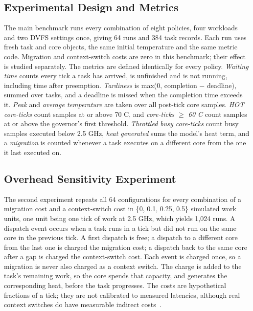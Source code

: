 \documentclass[conference]{IEEEtran}
\begin{document}
\subsection{Experimental Design and Metrics}\label{sec:method-design}
The main benchmark runs every combination of eight policies, four workloads and two DVFS settings once, giving 64 runs and 384 task records. Each run uses fresh task and core objects, the same initial temperature and the same metric code. Migration and context-switch costs are zero in this benchmark; their effect is studied separately. The metrics are defined identically for every policy. \emph{Waiting time} counts every tick a task has arrived, is unfinished and is not running, including time after preemption. \emph{Tardiness} is max(0, completion $-$ deadline), summed over tasks, and a deadline is missed when the completion time exceeds it. \emph{Peak} and \emph{average temperature} are taken over all post-tick core samples. \emph{HOT core-ticks} count samples at or above 70 \textdegree{}C, and \emph{core-ticks $\geq$ 60 \textdegree{}C} count samples at or above the governor's first threshold. \emph{Throttled busy core-ticks} count busy samples executed below 2.5 GHz, \emph{heat generated} sums the model's heat term, and a \emph{migration} is counted whenever a task executes on a different core from the one it last executed on.

\subsection{Overhead Sensitivity Experiment}\label{sec:method-overhead}
The second experiment repeats all 64 configurations for every combination of a migration cost and a context-switch cost in \{0, 0.1, 0.25, 0.5\} simulated work units, one unit being one tick of work at 2.5 GHz, which yields 1,024 runs. A dispatch event occurs when a task runs in a tick but did not run on the same core in the previous tick. A first dispatch is free; a dispatch to a different core from the last one is charged the migration cost; a dispatch back to the same core after a gap is charged the context-switch cost. Each event is charged once, so a migration is never also charged as a context switch. The charge is added to the task's remaining work, so the core spends that capacity, and generates the corresponding heat, before the task progresses. The costs are hypothetical fractions of a tick; they are not calibrated to measured latencies, although real context switches do have measurable indirect costs~\cite{li2007}.
\end{document}
